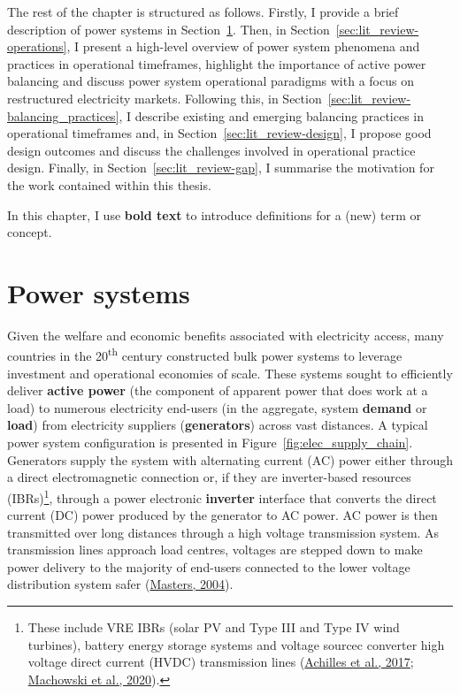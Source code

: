 \documentclass[12pt,a4paper,]{report}
\begin{document}
The rest of the chapter is structured as follows. Firstly, I provide a
brief description of power systems in
Section~\ref{sec:lit_review-power_systems}. Then, in
Section~\ref{sec:lit_review-operations}, I present a high-level overview
of power system phenomena and practices in operational timeframes,
highlight the importance of active power balancing and discuss power
system operational paradigms with a focus on restructured electricity
markets. Following this, in
Section~\ref{sec:lit_review-balancing_practices}, I describe existing
and emerging balancing practices in operational timeframes and, in
Section~\ref{sec:lit_review-design}, I propose good design outcomes and
discuss the challenges involved in operational practice design. Finally,
in Section~\ref{sec:lit_review-gap}, I summarise the motivation for the
work contained within this thesis.

In this chapter, I use \textbf{bold text} to introduce definitions for a
(new) term or concept.

\hypertarget{sec:lit_review-power_systems}{%
\section{Power systems}\label{sec:lit_review-power_systems}}

Given the welfare and economic benefits associated with electricity
access, many countries in the 20\textsuperscript{th} century constructed
bulk power systems to leverage investment and operational economies of
scale. These systems sought to efficiently deliver \textbf{active power}
(the component of apparent power that does work at a load) to numerous
electricity end-users (in the aggregate, system \textbf{demand} or
\textbf{load}) from electricity suppliers (\textbf{generators}) across
vast distances. A typical power system configuration is presented in
Figure~\ref{fig:elec_supply_chain}. Generators supply the system with
alternating current (AC) power either through a direct electromagnetic
connection or, if they are inverter-based resources (IBRs)\footnote{These
  include VRE IBRs (solar PV and Type III and Type IV wind turbines),
  battery energy storage systems and voltage sourcec converter high
  voltage direct current (HVDC) transmission lines
  (\protect\hyperlink{ref-achillesIntegratingInverterBasedResources2017}{Achilles
  et al., 2017};
  \protect\hyperlink{ref-machowskiPowerSystemDynamics2020}{Machowski et
  al., 2020}).}, through a power electronic \textbf{inverter} interface
that converts the direct current (DC) power produced by the generator to
AC power. AC power is then transmitted over long distances through a
high voltage transmission system. As transmission lines approach load
centres, voltages are stepped down to make power delivery to the
majority of end-users connected to the lower voltage distribution system
safer
(\protect\hyperlink{ref-mastersRenewableEfficientElectric2004}{Masters,
2004}).
\end{document}
